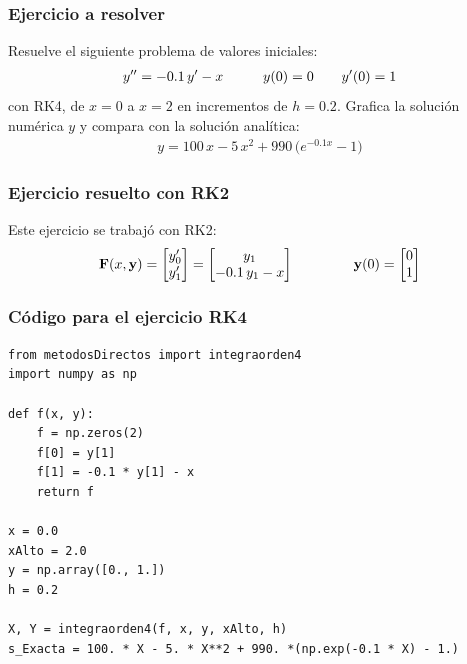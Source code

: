 \documentclass[12pt]{beamer}
\begin{document}
\begin{frame}
\frametitle{Ejercicio a resolver}
Resuelve el siguiente problema de valores iniciales:
\pause
\begin{align*}
{y}^{\prime \prime} = -0.1 \, {y}^{\prime} - x \hspace{1cm} y (0) = 0 \hspace{0.7cm} {y}^{\prime} (0) = 1
\end{align*}
con RK4, de $x = 0$ a $x = 2$ en incrementos de $h = 0.2$. \pause Grafica la solución numérica $y$ y compara con la solución analítica:
\pause
\begin{align*}
y = 100 \, x - 5 \, x^{2} + 990 \, \big( e^{-0.1 x} - 1 \big)
\end{align*}
\end{frame}
\begin{frame}
\frametitle{Ejercicio resuelto con RK2}
Este ejercicio se trabajó con RK2:
\pause
\begin{align*}
\mathbf{F} (x, \mathbf{y}) = 
\begin{bmatrix}
{y}^{\prime}_{0} \\
{y}^{\prime}_{1}
\end{bmatrix} =
\begin{bmatrix}
y_{1} \\
-0.1 \, y_{1} - x
\end{bmatrix}
\hspace{1.5cm}
\mathbf{y} (0) = 
\begin{bmatrix}
0 \\
1
\end{bmatrix}
\end{align*}
\end{frame}
\begin{frame}
\frametitle{Código para el ejercicio RK4}
\begin{lstlisting}[caption=Código para resolver el ejercicio con el método RK4]
from metodosDirectos import integraorden4
import numpy as np

def f(x, y):
	f = np.zeros(2)
	f[0] = y[1]
	f[1] = -0.1 * y[1] - x
	return f

x = 0.0
xAlto = 2.0
y = np.array([0., 1.])
h = 0.2

X, Y = integraorden4(f, x, y, xAlto, h)
s_Exacta = 100. * X - 5. * X**2 + 990. *(np.exp(-0.1 * X) - 1.)
\end{lstlisting}
\end{frame}
\end{document}

